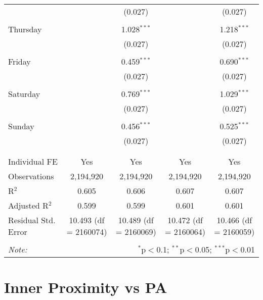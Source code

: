 \documentclass[
]{article}
\begin{document}
\begin{table}[!htbp]
{\begin{tabular}{@{\extracolsep{5pt}}lcccc}
  &  & (0.027) &  & (0.027) \\ 
  & & & & \\ 
 Thursday &  & 1.028$^{***}$ &  & 1.218$^{***}$ \\ 
  &  & (0.027) &  & (0.027) \\ 
  & & & & \\ 
 Friday &  & 0.459$^{***}$ &  & 0.690$^{***}$ \\ 
  &  & (0.027) &  & (0.027) \\ 
  & & & & \\ 
 Saturday &  & 0.769$^{***}$ &  & 1.029$^{***}$ \\ 
  &  & (0.027) &  & (0.027) \\ 
  & & & & \\ 
 Sunday &  & 0.456$^{***}$ &  & 0.525$^{***}$ \\ 
  &  & (0.027) &  & (0.027) \\ 
  & & & & \\ 
\hline \\[-1.8ex] 
Individual FE & Yes & Yes & Yes & Yes \\ 
Observations & 2,194,920 & 2,194,920 & 2,194,920 & 2,194,920 \\ 
R$^{2}$ & 0.605 & 0.606 & 0.607 & 0.607 \\ 
Adjusted R$^{2}$ & 0.599 & 0.599 & 0.601 & 0.601 \\ 
Residual Std. Error & 10.493 (df = 2160074) & 10.489 (df = 2160069) & 10.472 (df = 2160064) & 10.466 (df = 2160059) \\ 
\hline 
\hline \\[-1.8ex] 
\textit{Note:}  & \multicolumn{4}{r}{$^{*}$p$<$0.1; $^{**}$p$<$0.05; $^{***}$p$<$0.01} \\ 
\end{tabular}
} 
\end{table} 
\newpage
\section{Inner Proximity vs PA}
\end{document}
